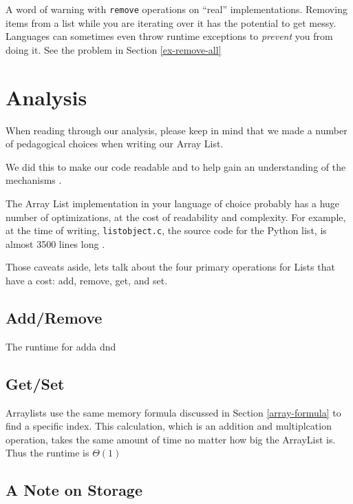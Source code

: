 A word of warning with \texttt{remove} operations on  ``real'' implementations.  Removing items from a list while you are iterating over it has the potential to get messy.  Languages can sometimes even throw runtime exceptions to \textit{prevent} you from doing it.  See the problem in Section \ref{ex-remove-all}

\section{Analysis}

When reading through our analysis, please keep in mind that we made a number of pedagogical choices when writing our Array List. 

We did this to make our code readable and to help gain an understanding of the mechanisms .

The Array List implementation in your language of choice probably has a huge number of optimizations, at the cost of readability and complexity.  For example, at the time of writing, \texttt{listobject.c}, the source code for the Python list, is almost 3500 lines long \cite{py-list-source}.

Those caveats aside, lets talk about the four primary operations for Lists that have a cost: add, remove, get, and set.


\subsection{Add/Remove}

The runtime for adda dnd 



\subsection{Get/Set}

Arraylists use the same memory formula discussed in Section \ref{array-formula} to find a specific index.  This calculation, which is an addition and multiplcation operation, takes the same amount of time no matter how big the ArrayList is.  Thus the runtime is $\Theta(1)$



\subsection{A Note on Storage}

